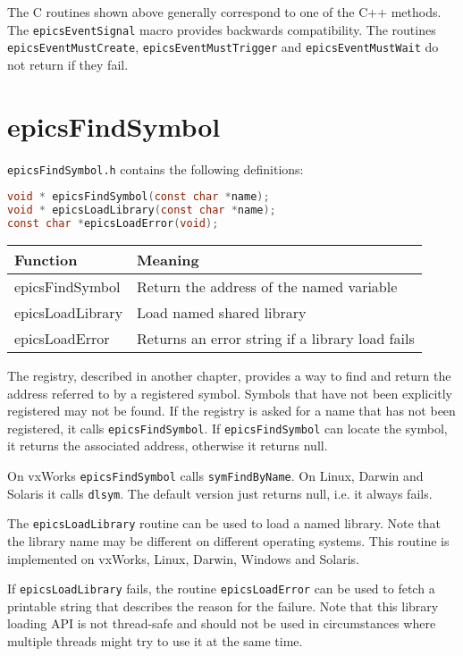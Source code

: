 The C routines shown above generally correspond to one of the C++ methods.
The \verb|epicsEventSignal| macro provides backwards compatibility.
The routines \verb|epicsEventMustCreate|, \verb|epicsEventMustTrigger| and \verb|epicsEventMustWait| do not return if they fail.

\section{epicsFindSymbol}

\verb|epicsFindSymbol.h| contains the following definitions:

\begin{lstlisting}[language=C]
void * epicsFindSymbol(const char *name);
void * epicsLoadLibrary(const char *name);
const char *epicsLoadError(void);
\end{lstlisting}

\begin{center}
\begin{longtable}{p{1.35in}p{2.5in}}
\textbf{Function} & \textbf{Meaning}\\
\hline
epicsFindSymbol & Return the address of the named variable\\
epicsLoadLibrary & Load named shared library\\
epicsLoadError & Returns an error string if a library load fails
\end{longtable}
\end{center}

The registry, described in another chapter, provides a way to find and return the address referred to by a registered symbol.
Symbols that have not been explicitly registered may not be found.
If the registry is asked for a name that has not been registered, it calls \verb|epicsFindSymbol|.
If \verb|epicsFindSymbol| can locate the symbol, it returns the associated address, otherwise it returns null.

On vxWorks \verb|epicsFindSymbol| calls \verb|symFindByName|.
On Linux, Darwin and Solaris it calls \verb|dlsym|.
The default version just returns null, i.e. it always fails.

The \verb|epicsLoadLibrary| routine can be used to load a named library.
Note that the library name may be different on different operating systems.
This routine is implemented on vxWorks, Linux, Darwin, Windows and Solaris.

If \verb|epicsLoadLibrary| fails, the routine \verb|epicsLoadError| can be used to fetch a printable string that describes the reason for the failure.
Note that this library loading API is not thread-safe and should not be used in circumstances where multiple threads might try to use it at the same time.

